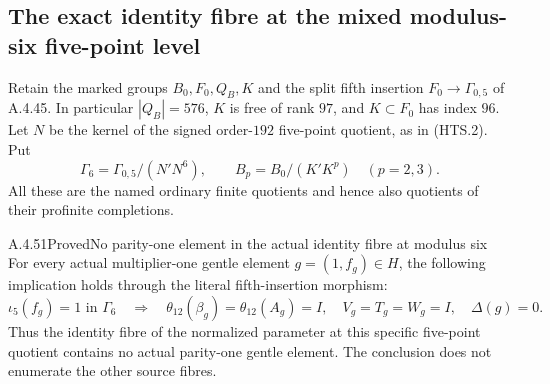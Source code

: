 \subsection{The exact identity fibre at the mixed modulus-six five-point level}

Retain the marked groups $B_0,F_0,Q_B,K$ and the
split fifth insertion $F_0\to\Gamma_{0,5}$ of
A.4.45.  In particular $|Q_B|=576$, $K$ is free
of rank $97$, and $K\subset F_0$ has index $96$.
Let $N$ be the kernel of the signed order-$192$
five-point quotient, as in (HTS.2).  Put
\[
 \Gamma_6=\Gamma_{0,5}/(N'N^6),\qquad
 B_p=B_0/(K'K^p)\quad(p=2,3).
 \tag{MIF.1}
\]
All these are the named ordinary finite quotients
and hence also quotients of their profinite
completions.

\begin{result}{A.4.51}{Proved}{No parity-one element in the actual identity fibre at modulus six}
For every actual multiplier-one gentle element
$g=(1,f_g)\in H$, the following implication holds
through the literal fifth-insertion morphism:
\[
 \iota_5(f_g)=1\text{ in }\Gamma_6
 \quad\Longrightarrow\quad
 \theta_{12}(\beta_g)=\theta_{12}(A_g)=I,
 \quad V_g=T_g=W_g=I,
 \quad \Delta(g)=0.
 \tag{MIF.2}
\]
Thus the identity fibre of the normalized parameter
at this specific five-point quotient contains no
actual parity-one gentle element.  The conclusion
does not enumerate the other source fibres.
\end{result}

